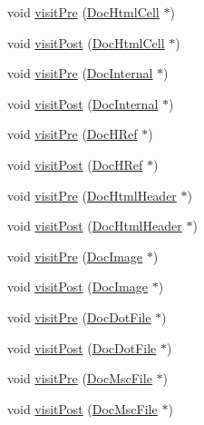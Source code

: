 \begin{DoxyCompactItemize}
\item 
void \hyperlink{class_r_t_f_doc_visitor_a161b776da556acca213689098efff8ad}{visit\+Pre} (\hyperlink{class_doc_html_cell}{Doc\+Html\+Cell} $\ast$)
\item 
void \hyperlink{class_r_t_f_doc_visitor_ab7b0dc5eec17d4445fc1fea39d24675c}{visit\+Post} (\hyperlink{class_doc_html_cell}{Doc\+Html\+Cell} $\ast$)
\item 
void \hyperlink{class_r_t_f_doc_visitor_a109ff5483ac6c005143442bdd4fc9404}{visit\+Pre} (\hyperlink{class_doc_internal}{Doc\+Internal} $\ast$)
\item 
void \hyperlink{class_r_t_f_doc_visitor_ab93d234a9fc677469fefd32f3882a51b}{visit\+Post} (\hyperlink{class_doc_internal}{Doc\+Internal} $\ast$)
\item 
void \hyperlink{class_r_t_f_doc_visitor_ab75464df6990d98abc270b9ac5a1dbf2}{visit\+Pre} (\hyperlink{class_doc_h_ref}{Doc\+H\+Ref} $\ast$)
\item 
void \hyperlink{class_r_t_f_doc_visitor_a6d273333f4662958d2e1a4b5f8fa973d}{visit\+Post} (\hyperlink{class_doc_h_ref}{Doc\+H\+Ref} $\ast$)
\item 
void \hyperlink{class_r_t_f_doc_visitor_a26c37e2ce99ad46525e5bdfd2a5ef75d}{visit\+Pre} (\hyperlink{class_doc_html_header}{Doc\+Html\+Header} $\ast$)
\item 
void \hyperlink{class_r_t_f_doc_visitor_aca6178b87763c465feaa2aa54cbf0195}{visit\+Post} (\hyperlink{class_doc_html_header}{Doc\+Html\+Header} $\ast$)
\item 
void \hyperlink{class_r_t_f_doc_visitor_a0c02fafee2f0b5610201b718d3629318}{visit\+Pre} (\hyperlink{class_doc_image}{Doc\+Image} $\ast$)
\item 
void \hyperlink{class_r_t_f_doc_visitor_a8a58ed5b56bcfaa2c84edf43faa1b634}{visit\+Post} (\hyperlink{class_doc_image}{Doc\+Image} $\ast$)
\item 
void \hyperlink{class_r_t_f_doc_visitor_a4edf604bb8020f1f2b56ab3f0fe87ade}{visit\+Pre} (\hyperlink{class_doc_dot_file}{Doc\+Dot\+File} $\ast$)
\item 
void \hyperlink{class_r_t_f_doc_visitor_a80e7537afb351b5a6f100b57dd74c43f}{visit\+Post} (\hyperlink{class_doc_dot_file}{Doc\+Dot\+File} $\ast$)
\item 
void \hyperlink{class_r_t_f_doc_visitor_a7e32f7a09ad8e8ee05e153b760f402ec}{visit\+Pre} (\hyperlink{class_doc_msc_file}{Doc\+Msc\+File} $\ast$)
\item 
void \hyperlink{class_r_t_f_doc_visitor_a34a34c4fe4400d1970395520998cc38a}{visit\+Post} (\hyperlink{class_doc_msc_file}{Doc\+Msc\+File} $\ast$)

\end{DoxyCompactItemize}
